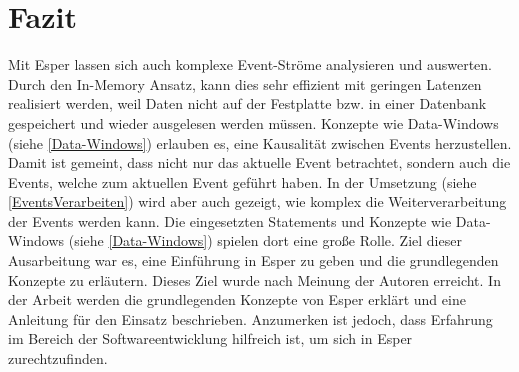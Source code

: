 \chapter{Fazit}
Mit Esper lassen sich auch komplexe Event-Ströme analysieren und auswerten. Durch den In-Memory Ansatz, kann dies sehr effizient mit geringen Latenzen realisiert werden, weil Daten nicht auf der Festplatte bzw. in einer Datenbank gespeichert und wieder ausgelesen werden müssen.
\absatz
Konzepte wie Data-Windows (siehe \ref{Data-Windows}) erlauben es, eine Kausalität zwischen Events herzustellen.
Damit ist gemeint, dass nicht nur das aktuelle Event betrachtet, sondern auch die Events, welche zum aktuellen Event geführt haben.
\absatz
In der Umsetzung (siehe \ref{EventsVerarbeiten}) wird aber auch gezeigt, wie komplex die Weiterverarbeitung der Events werden kann. Die eingesetzten Statements und Konzepte wie Data-Windows (siehe \ref{Data-Windows}) spielen dort eine große Rolle.
\absatz
Ziel dieser Ausarbeitung war es, eine Einführung in Esper zu geben und die grundlegenden Konzepte zu erläutern. Dieses Ziel wurde nach Meinung der Autoren erreicht. In der Arbeit werden die grundlegenden Konzepte von Esper erklärt und eine Anleitung für den Einsatz beschrieben.
\absatz
Anzumerken ist jedoch, dass Erfahrung im Bereich der Softwareentwicklung hilfreich ist, um sich in Esper zurechtzufinden.